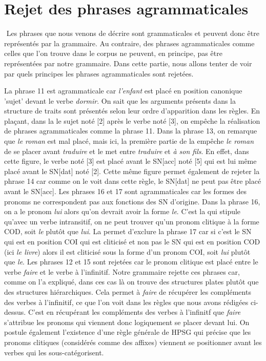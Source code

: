 \section{Rejet des phrases agrammaticales}

        ﻿	Les phrases que nous venons de décrire sont grammaticales et peuvent donc être représentés par la grammaire. Au contraire,
des phrases agrammaticales comme celles que l'on trouve dans le corpus ne peuvent, en principe, pas être représentées par notre
grammaire. Dans cette partie, nous allons tenter de voir par quels principes les phrases agrammaticales sont rejetées.

	La phrase 11 est agrammaticale car \emph{l'enfant} est placé en position canonique 'sujet' devant le verbe \emph{dormir}.
On sait que les arguments présents dans la structure de traits sont présentés selon leur ordre d'apparition dans les règles.
En plaçant, dans la  le sujet noté [2] après le verbe noté [3], on empêche la réalisation de phrases
agrammaticales comme la phrase 11.
	Dans la phrase 13, on remarque que \emph{le roman} est mal placé, mais ici, la première partie de la
 empêche \emph{le roman} de se placer avant \emph{traduire} et le met entre \emph{traduire} et
\emph{à son fils}. En effet, dans cette figure, le verbe noté [3] est placé avant le SN[acc] noté [5] qui est lui même placé
avant le SN[dat] noté [2]. Cette même figure permet également de rejeter la phrase 14 car comme on le voit dans cette règle,
le SN[dat] ne peut pas être placé avant le SN[acc].
	Les phrases 16 et 17 sont agrammaticales car les formes des pronoms ne correspondent pas aux fonctions des SN d'origine.
Dans la phrase 16, on a le pronom \emph{lui} alors qu'on devrait avoir la forme \emph{le}. C'est la 
qui stipule qu'avec un verbe intransitif, on ne peut trouver qu'un pronom clitique à la forme COD, soit \emph{le} plutôt que
\emph{lui}. La  permet d'exclure la phrase 17 car si c'est le SN qui est en position COI qui est
cliticisé et non pas le SN qui est en position COD (ici \emph{le livre}) alors il est cliticisé sous la forme d'un pronom COI,
soit \emph{lui} plutôt que \emph{le}.
	Les phrases 12 et 15 sont rejetées car le pronom clitique est placé entre le verbe \emph{faire} et le verbe à l'infinitif.
Notre grammaire rejette ces phrases car, comme on l'a expliqué, dans ces cas là on trouve des structures plates plutôt que des
structures hiérarchiques. Cela permet à \emph{faire} de récupérer les compléments des verbes à l'infinitif, ce que l'on voit
dans les règles que nous avons rédigées ci-dessus. C'est en récupérant les compléments des verbes à l'infinitf que \emph{faire}
s'attribue les pronoms qui viennent donc logiquement se placer devant lui. On postule également l'existence d'une règle
générale de HPSG qui précise que les pronoms clitiques (considérés comme des affixes) viennent se positionner avant les verbes
qui les sous-catégorisent.
